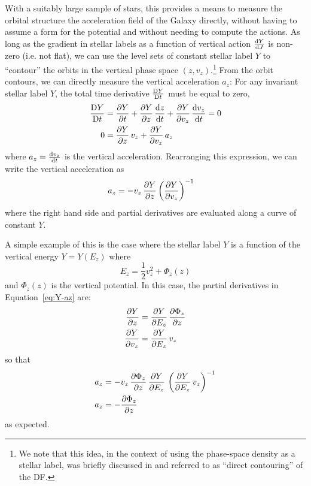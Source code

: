 With a suitably large sample of stars, this provides a means to measure the orbital
structure the acceleration field of the Galaxy directly, without having to assume a form
for the potential and without needing to compute the actions.
As long as the gradient in stellar labels as a function of vertical action
$\frac{\mathrm{d}{Y}}{\mathrm{d}{J}}$ is non-zero (i.e. not flat), we can use the level sets of constant
stellar label $Y$ to ``contour'' the orbits in the vertical phase space $(z,
v_z)$.\footnote{We note that this idea, in the context of using the phase-space density
as a stellar label, was briefly discussed in \citet{Kuijken:19XX} and referred to as
``direct contouring'' of the DF.}
From the orbit contours, we can directly measure the vertical acceleration $a_z$: For
any invariant stellar label $Y$, the total time derivative $\frac{\mathrm{D}{Y}}{\mathrm{D}{t}}$ must be equal
to zero,
\begin{align}
    \frac{\mathrm{D}{Y}}{\mathrm{D}{t}} &= \frac{\partial {Y}}{\partial {t}} +
        \frac{\partial {Y}}{\partial {z}} \, \frac{\mathrm{d}{z}}{\mathrm{d}{t}} + \frac{\partial {Y}}{\partial {v_z}} \, \frac{\mathrm{d}{v_z}}{\mathrm{d}{t}} = 0 \\
    0 &= \frac{\partial {Y}}{\partial {z}} \, v_z + \frac{\partial {Y}}{\partial {v_z}} \, a_z
\end{align}
where $a_z = \frac{\mathrm{d}{v_z}}{\mathrm{d}{t}}$ is the vertical acceleration.
Rearranging this expression, we can write the vertical acceleration as
\begin{align}
    a_z &= - v_z \, \frac{\partial {Y}}{\partial {z}} \left(\frac{\partial {Y}}{\partial {v_z}}\right)^{-1} \label{eq:Y-az}
\end{align}
where the right hand side and partial derivatives are evaluated along a curve of
constant $Y$.

A simple example of this is the case where the stellar label $Y$ is a function of the
vertical energy $Y=Y(E_z)$ where
\begin{equation}
    E_z = \frac{1}{2} v_z^2 + \Phi_z(z)
\end{equation}
and $\Phi_z(z)$ is the vertical potential.
In this case, the partial derivatives in Equation~\ref{eq:Y-az} are:
\begin{align}
    \frac{\partial {Y}}{\partial {z}} &= \frac{\partial {Y}}{\partial {E_z}} \, \frac{\partial {\Phi_z}}{\partial {z}}\\
    \frac{\partial {Y}}{\partial {v_z}} &= \frac{\partial {Y}}{\partial {E_z}} \, v_z
\end{align}
so that
\begin{align}
    a_z &= - v_z \, \frac{\partial {\Phi_z}}{\partial {z}} \, \frac{\partial {Y}}{\partial {E_z}} \, \left(\frac{\partial {Y}}{\partial {E_z}} \, v_z\right)^{-1} \\
    a_z &= - \frac{\partial {\Phi_z}}{\partial {z}}
\end{align}
as expected.

